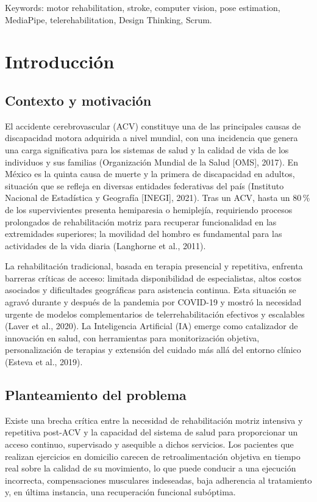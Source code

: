 \documentclass[11pt,a4paper]{article}
\begin{document}
\vspace{0.8em}
\noindent Keywords: motor rehabilitation, stroke, computer vision, pose estimation, MediaPipe, telerehabilitation, Design Thinking, Scrum.

\clearpage
\tableofcontents
\clearpage
\listoftables
\clearpage
\listoffigures
\clearpage
{}
\setcounter{page}{1}

\section{Introducción}

\subsection{Contexto y motivación}
El accidente cerebrovascular (ACV) constituye una de las principales causas de discapacidad motora adquirida a nivel mundial, con una incidencia que genera una carga significativa para los sistemas de salud y la calidad de vida de los individuos y sus familias (Organización Mundial de la Salud [OMS], 2017). En México es la quinta causa de muerte y la primera de discapacidad en adultos, situación que se refleja en diversas entidades federativas del país (Instituto Nacional de Estadística y Geografía [INEGI], 2021). Tras un ACV, hasta un 80\,\% de los supervivientes presenta hemiparesia o hemiplejía, requiriendo procesos prolongados de rehabilitación motriz para recuperar funcionalidad en las extremidades superiores; la movilidad del hombro es fundamental para las actividades de la vida diaria (Langhorne et al., 2011).

La rehabilitación tradicional, basada en terapia presencial y repetitiva, enfrenta barreras críticas de acceso: limitada disponibilidad de especialistas, altos costos asociados y dificultades geográficas para asistencia continua. Esta situación se agravó durante y después de la pandemia por COVID-19 y mostró la necesidad urgente de modelos complementarios de telerrehabilitación efectivos y escalables (Laver et al., 2020). La Inteligencia Artificial (IA) emerge como catalizador de innovación en salud, con herramientas para monitorización objetiva, personalización de terapias y extensión del cuidado más allá del entorno clínico (Esteva et al., 2019).

\subsection{Planteamiento del problema}
Existe una brecha crítica entre la necesidad de rehabilitación motriz intensiva y repetitiva post-ACV y la capacidad del sistema de salud para proporcionar un acceso continuo, supervisado y asequible a dichos servicios. Los pacientes que realizan ejercicios en domicilio carecen de retroalimentación objetiva en tiempo real sobre la calidad de su movimiento, lo que puede conducir a una ejecución incorrecta, compensaciones musculares indeseadas, baja adherencia al tratamiento y, en última instancia, una recuperación funcional subóptima.
\end{document}
